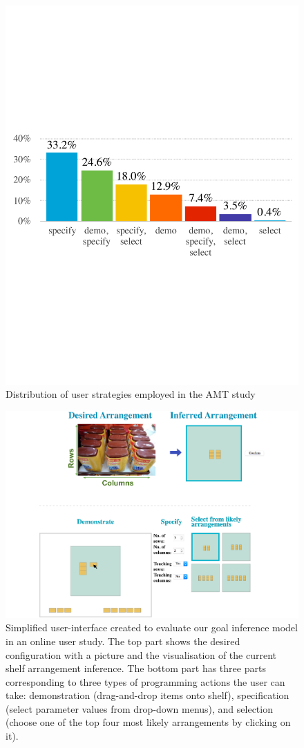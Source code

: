 \begin{figure}
	\centering
	\includegraphics[width=0.7\linewidth]{figures/strategies}
	\caption{Distribution of user strategies employed in the AMT study}
	\label{fig:strategies}
\end{figure}


\begin{figure}
	\includegraphics[width=\linewidth]{figures/amt-gui}
	\caption{Simplified user-interface created to evaluate our goal inference model in an online user study. The top part shows the desired configuration with a picture and the visualisation of the current shelf arrangement inference. The bottom part has three parts corresponding to three types of programming actions the user can take: demonstration (drag-and-drop items onto shelf), specification (select parameter values from drop-down menus), and selection (choose one of the top four most likely arrangements by clicking on it).}
	\label{fig:amt-gui}
\end{figure}

